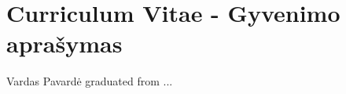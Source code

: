 \chapter*{Curriculum Vitae - Gyvenimo aprašymas}
\label{cha:cv}

	



Vardas Pavardė graduated from ... 
